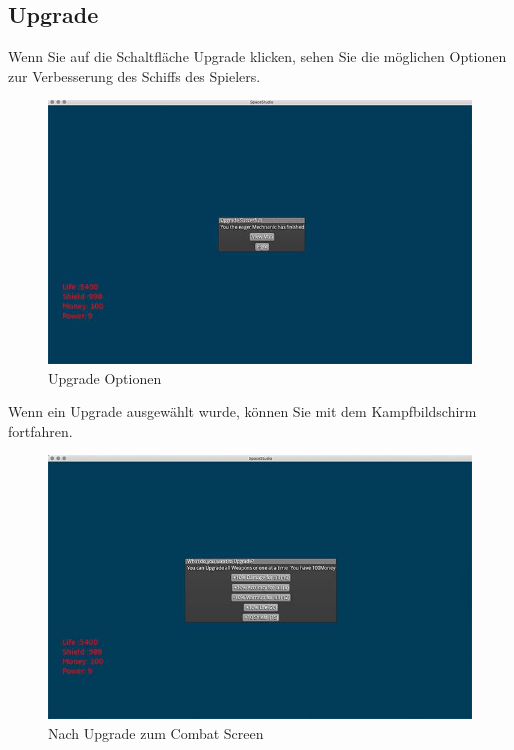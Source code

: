 \documentclass[12pt]{article}
\begin{document}
\subsection{Upgrade}
Wenn Sie auf die Schaltfläche Upgrade klicken, sehen Sie die möglichen Optionen zur Verbesserung des Schiffs des Spielers.
\begin{figure}[htp]
\centering
\includegraphics[scale=0.6]{TestProtocolBilder/nachupgrade@0,25x.jpg}
\caption{Upgrade Optionen}
\end{figure}

Wenn ein Upgrade ausgewählt wurde, können Sie mit dem Kampfbildschirm fortfahren.
\begin{figure}[htp]
\centering
\includegraphics[scale=0.6]{TestProtocolBilder/upgrade@0,25x.jpg}
\caption{Nach Upgrade zum Combat Screen}
\end{figure}
\end{document}
